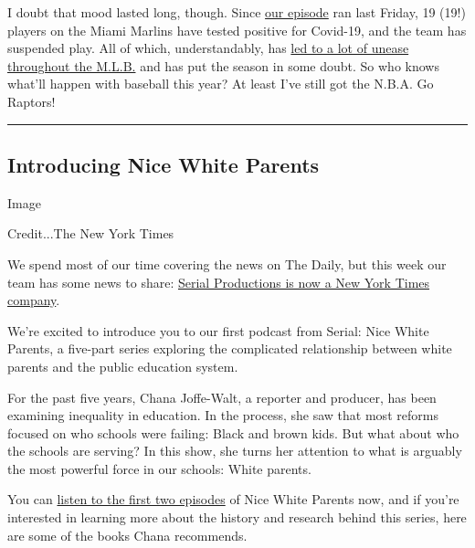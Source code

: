 I doubt that mood lasted long, though. Since
\href{https://www.nytimes3xbfgragh.onion/2020/07/24/podcasts/the-daily/mlb-baseball-season-coronavirus.html?action=click\&module=audio-series-bar\&region=header\&pgtype=Article}{our
episode} ran last Friday, 19 (19!) players on the Miami Marlins have
tested positive for Covid-19, and the team has suspended play. All of
which, understandably, has
\href{https://www.nytimes3xbfgragh.onion/2020/07/28/sports/baseball/marlins-outbreak-mlb-coronavirus.html}{led
to a lot of unease throughout the M.L.B.} and has put the season in some
doubt. So who knows what'll happen with baseball this year? At least
I've still got the N.B.A. Go Raptors!

\begin{center}\rule{0.5\linewidth}{\linethickness}\end{center}

\hypertarget{introducing-nice-white-parents}{%
\subsection{Introducing Nice White
Parents}\label{introducing-nice-white-parents}}

Image

Credit...The New York Times

We spend most of our time covering the news on The Daily, but this week
our team has some news to share:
\href{https://www.nytimes3xbfgragh.onion/2020/07/22/business/media/new-york-times-serial.html}{Serial
Productions is now a New York Times company}.

We're excited to introduce you to our first podcast from Serial: Nice
White Parents, a five-part series exploring the complicated relationship
between white parents and the public education system.

For the past five years, Chana Joffe-Walt, a reporter and producer, has
been examining inequality in education. In the process, she saw that
most reforms focused on who schools were failing: Black and brown kids.
But what about who the schools are serving? In this show, she turns her
attention to what is arguably the most powerful force in our schools:
White parents.

You can
\href{https://www.nytimes3xbfgragh.onion/2020/07/30/podcasts/nice-white-parents-serial.html}{listen
to the first two episodes} of Nice White Parents now, and if you're
interested in learning more about the history and research behind this
series, here are some of the books Chana recommends.

